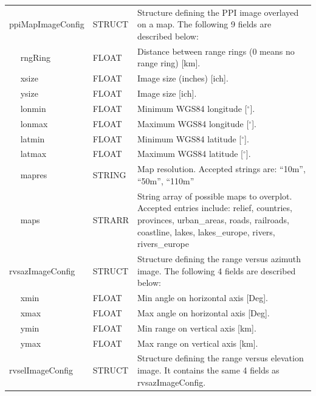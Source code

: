 \documentclass[a4paper,11pt,pdftex,twoside]{scrartcl}
\begin{document}
{{{\begin{longtable}{p{}p{}p{}}
ppiMapImageConfig     & STRUCT & Structure defining the PPI image overlayed on a map. The following 9 fields are described below:\\
$\quad$ rngRing  & FLOAT      & Distance between range rings (0 means no range ring) [km].\\
$\quad$ xsize    & FLOAT      & Image size (inches) [ich].\\
$\quad$ ysize    & FLOAT      & Image size [ich].\\
$\quad$ lonmin   & FLOAT      & Minimum WGS84 longitude [$^\circ$].\\
$\quad$ lonmax   & FLOAT      & Maximum WGS84 longitude [$^\circ$].\\
$\quad$ latmin   & FLOAT      & Minimum WGS84 latitude [$^\circ$].\\
$\quad$ latmax   & FLOAT      & Maximum WGS84 latitude [$^\circ$].\\
$\quad$ mapres   & STRING     & Map resolution. Accepted strings are: ``10m'', ``50m'', ``110m'' \\
$\quad$ maps     & STRARR     & String array of possible maps to overplot. Accepted entries include:
                                relief, countries, provinces, urban\_areas, roads, railroads,
                                coastline, lakes, lakes\_europe, rivers, rivers\_europe   \\



rvsazImageConfig     & STRUCT    & Structure defining the range versus azimuth image. The following 4 fields are described below:\\
$\quad$ xmin       & FLOAT     & Min angle on horizontal axis [Deg].\\
$\quad$ xmax       & FLOAT     & Max angle on horizontal axis [Deg].\\
$\quad$ ymin       & FLOAT     & Min range on vertical axis [km].\\
$\quad$ ymax       & FLOAT     & Max range on vertical axis [km].\\

rvselImageConfig     & STRUCT    & Structure defining the range versus elevation image. It contains the same 4 fields as rvsazImageConfig.\\


\end{longtable}}}}
\end{document}
